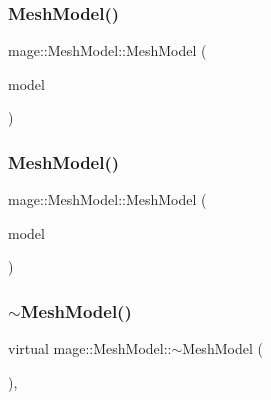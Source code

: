 \hypertarget{classmage_1_1_mesh_model_a74d2443e5d4b0f66ef981ad1312e4987}{}\label{classmage_1_1_mesh_model_a74d2443e5d4b0f66ef981ad1312e4987} 
\subsubsection{\texorpdfstring{Mesh\+Model()}{MeshModel()}\hspace{0.1cm}{\footnotesize\ttfamily [2/3]}}
{\footnotesize\ttfamily mage\+::\+Mesh\+Model\+::\+Mesh\+Model (\begin{DoxyParamCaption}\item[{const \hyperlink{classmage_1_1_mesh_model}{Mesh\+Model} \&}]{model }\end{DoxyParamCaption})}

\hypertarget{classmage_1_1_mesh_model_afd5dc4033fe3d1277e4d2756b0de2c04}{}\label{classmage_1_1_mesh_model_afd5dc4033fe3d1277e4d2756b0de2c04} 
\subsubsection{\texorpdfstring{Mesh\+Model()}{MeshModel()}\hspace{0.1cm}{\footnotesize\ttfamily [3/3]}}
{\footnotesize\ttfamily mage\+::\+Mesh\+Model\+::\+Mesh\+Model (\begin{DoxyParamCaption}\item[{\hyperlink{classmage_1_1_mesh_model}{Mesh\+Model} \&\&}]{model }\end{DoxyParamCaption})}

\hypertarget{classmage_1_1_mesh_model_a5e918737b966842a31381ef6c00ca6d2}{}\label{classmage_1_1_mesh_model_a5e918737b966842a31381ef6c00ca6d2} 
\subsubsection{\texorpdfstring{$\sim$\+Mesh\+Model()}{~MeshModel()}}
{\footnotesize\ttfamily virtual mage\+::\+Mesh\+Model\+::$\sim$\+Mesh\+Model (\begin{DoxyParamCaption}{ }\end{DoxyParamCaption})\hspace{0.3cm}{\ttfamily [virtual]}, {\ttfamily [default]}}



